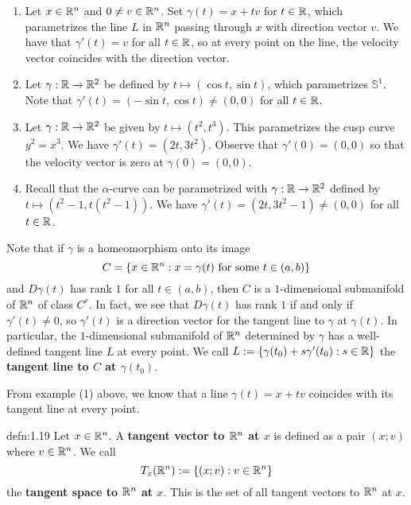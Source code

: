 \begin{enumerate}[(1)]
    \item Let $x \in \mathbb{R}^n$ and $0 \neq v \in \mathbb{R}^n$. Set $\gamma(t) = x + tv$ 
    for $t \in \mathbb{R}$, which parametrizes the line $L$ in $\mathbb{R}^n$ passing through 
    $x$ with direction vector $v$. We have that $\gamma'(t) = v$ for all 
    $t \in \mathbb{R}$, so at every point on the line, the velocity vector coincides 
    with the direction vector. 

    \item Let $\gamma : \mathbb{R} \to \mathbb{R}^2$ be defined by $t \mapsto (\cos t, \sin t)$, 
    which parametrizes $\mathbb{S}^1$. Note that $\gamma'(t) = 
    (-\sin t, \cos t) \neq (0, 0)$ for all $t \in \mathbb{R}$. 

    \item Let $\gamma : \mathbb{R} \to \mathbb{R}^2$ be given by $t \mapsto (t^2, t^3)$. 
    This parametrizes the cusp curve $y^2 = x^3$. We have $\gamma'(t) = (2t, 3t^2)$. 
    Observe that $\gamma'(0) = (0, 0)$ so that the velocity vector 
    is zero at $\gamma(0) = (0, 0)$. 

    \item Recall that the $\alpha$-curve can be parametrized with 
    $\gamma : \mathbb{R} \to \mathbb{R}^2$ defined by $t \mapsto (t^2-1, t(t^2-1))$. 
    We have $\gamma'(t) = (2t, 3t^2-1) \neq (0, 0)$ for all $t \in \mathbb{R}$. 
\end{enumerate}

Note that if $\gamma$ is a homeomorphism onto its image 
\[ C = \{x \in \mathbb{R}^n : x = \gamma(t) \text{ for some } t \in (a, b)\} \] 
and $D\gamma(t)$ has rank $1$ for all $t \in (a, b)$, then $C$ is a 
$1$-dimensional submanifold of $\mathbb{R}^n$ of class $C^r$. In fact, we see that
$D\gamma(t)$ has rank $1$ if and only if $\gamma'(t) \neq 0$, so $\gamma'(t)$ 
is a direction vector for the tangent line to $\gamma$ at $\gamma(t)$. 
In particular, the $1$-dimensional submanifold of $\mathbb{R}^n$ determined by $\gamma$ 
has a well-defined tangent line $L$ at every point. We call 
$L := \{\gamma(t_0) + s\gamma'(t_0) : s \in \mathbb{R}\}$
the {\bf tangent line to $C$ at $\gamma(t_0)$}. 

From example (1) above, we know that a line $\gamma(t) = x + tv$ coincides 
with its tangent line at every point.

\begin{defn}{defn:1.19}
    Let $x \in \mathbb{R}^n$. A {\bf tangent vector to $\mathbb{R}^n$ at $x$} is defined as 
    a pair $(x; v)$ where $v \in \mathbb{R}^n$. We call 
    \[ T_x(\mathbb{R}^n) := \{(x; v) : v \in \mathbb{R}^n\} \] 
    the {\bf tangent space to $\mathbb{R}^n$ at $x$}. This is the set of all 
    tangent vectors to $\mathbb{R}^n$ at $x$. 
\end{defn}\vspace{-0.25cm}

